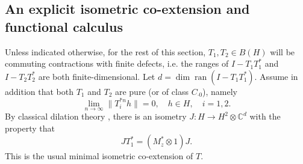 \documentclass[10pt]{amsart}
\newcommand{\bC}{{\mathbb{C}}}
\newcommand{\ran}{\operatorname{ran}}
\theoremstyle{definition}
\begin{document}
\subsection{An explicit isometric co-extension and functional calculus}\label{SS:coext}
Unless indicated otherwise, for the rest of this section, $T_1,T_2\in B(H)$ will be commuting contractions with finite defects, i.e. the ranges of $I-T_1T_1^*$ and $I-T_2T_2^*$ are both finite-dimensional. Let $d=\dim \ran( I-T_1T_1^*)$.  Assume in addition that both $T_1$ and $T_2$ are pure (or of class $C_{\cdot 0}$), namely
 \[
\lim_{n\to\infty} \|T_i^{*n}h\|=0,\quad h\in H, \quad i=1,2.
\]
By classical dilation theory \cite{nagy2010}, there is an isometry $J:H\to H^2\otimes \bC^d$ with the property that
\[
JT^*_1= (M^*_z\otimes 1) J.
\]
This is the usual minimal isometric co-extension of $T$. 
\end{document}

